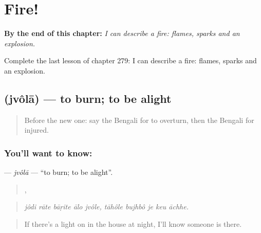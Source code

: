 
\chapter{Fire!}
\label{ch:bn-fire}

\begin{chapteropening}
\textbf{By the end of this chapter:} \emph{I can describe a fire: flames, sparks and an explosion.}

Complete the last lesson of chapter 279: I can describe a fire: flames, sparks and an explosion.
\end{chapteropening}

\section[\texorpdfstring{\bn{জ্বলা} (jvôlā)}{জ্বলা (jvôlā)}]{ (jvôlā) — to burn; to be alight}

\label{lesson:BN-C279-jvola}



\begin{quote}
Before the new one: say the Bengali for to overturn, then the Bengali for injured.
\end{quote}

\subsection*{You'll want to know: }
\textbf{} — \emph{jvôlā} — \textquotedblleft{}to burn; to be alight\textquotedblright{}.

\begin{quote}
    ,     
\end{quote}

\begin{quote}
\emph{jôdi rāte bāṛite ālo jvôle, tāhôle bujhbô je keu āchhe.}
\end{quote}

\begin{quote}
If there's a light on in the house at night, I'll know someone is there.
\end{quote}

